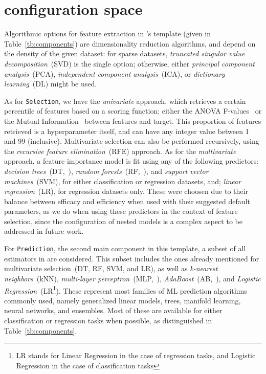 \section{\isklearn configuration space}
\label{app:config-space}

Algorithmic options for feature extraction in \isklearn's template (given in Table~\ref{tb:components}) are dimensionality reduction algorithms, and depend on the density of the given dataset: for sparse datasets, \textit{truncated singular value decomposition}~(SVD) is the single option; otherwise, either \textit{principal component analysis}~(PCA), \textit{independent component analysis}~(ICA), or \textit{dictionary learning}~(DL) might be used.

As for \texttt{\small Selection}, we have the \textit{univariate} approach, which retrieves a certain percentile of features based on a scoring function: either the ANOVA F-values~\cite{anova} or the Mutual Information~\cite{mutual-info} between features and target. This proportion of features retrieved is a hyperparameter itself, and can have any integer value between 1 and 99 (inclusive). Multivariate selection can also be performed recursively, using the \textit{recursive feature elimination}~(RFE) approach. As for the \textit{multivariate} approach, a feature importance model is fit using any of the following predictors: \textit{decision trees}~(DT,~\cite{decisiontrees}), \textit{random forests}~(RF,~\cite{randomforests}), and \textit{support vector machines}~(SVM), for either classification or regression datasets, and; \textit{linear regression}~(LR), for regression datasets only. These were choosen due to their balance between efficacy and efficiency when used with their suggested default parameters, as we do when using these predictors in the context of feature selection, since the configuration of nested models is a complex aspect to be addressed in future work.

For \texttt{\small Prediction}, the second main component in this template, a subset of all estimators in \isklearn are considered. This subset includes the ones already mentioned for multivariate selection~(DT, RF, SVM, and LR), as well as \textit{k-nearest neighbors}~(kNN), \textit{multi-layer perceptron}~(MLP,~\cite{mlp}), \textit{AdaBoost}~(AB,~\cite{adaboost}), and \textit{Logistic Regression}~(LR\footnote{LR stands for Linear Regression in the case of regression tasks, and Logistic Regression in the case of classification tasks}). These represent most families of ML prediction algorithms commonly used, namely generalized linear models, trees, manifold learning, neural networks, and ensembles. Most of these are available for either classification or regression tasks when possible, as distinguished in Table~\ref{tb:components}.

